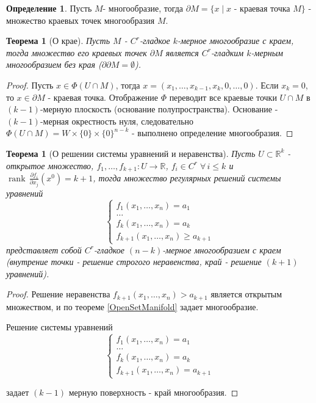 \documentclass[a5paper]{article}
\newcounter{through}
\theoremstyle{plain}
\newtheorem{theorem}[through]{Теорема}
\theoremstyle{definition}
\newtheorem{definition}[through]{Определение}
\numberwithin{through}{section}
\numberwithin{equation}{section}
\DeclareMathOperator{\rank}{rank}
\begin{document}
\begin{definition}
	Пусть $M$- многообразие, тогда $\partial M = \{x \mid x$ - краевая точка $M\}$ - множество краевых точек многообразия $M$.
\end{definition}

\begin{theorem}[О крае]
	Пусть $M$ - $C^r$-гладкое $k$-мерное многообразие с краем, тогда множество его краевых точек $\partial M$ является $C^r$-гладким $k$-мерным многообразием без края ($\partial \partial M = \emptyset$).
\end{theorem}

\begin{proof}
	Пусть $x \in \Phi(U \cap M)$, тогда $x=(x_1, \ldots, x_{k-1}, x_k, 0, \ldots, 0)$. %
	Если $x_k = 0$, то $x \in \partial M$ - краевая точка. Отображение $\Phi$ переводит все краевые точки $U \cap M$ в $(k-1)$-мерную плоскость (основание полупространства). Основание - $(k-1)$-мерная окрестность нуля, следовательно $\Phi(U \cap M) = W \times \{0\} \times \{0\}^{n-k}$ - выполнено определение многообразия.
\end{proof}

\begin{theorem}[О решении системы уравнений и неравенства]
	Пусть $U \subset \mathbb{R}^k$ - открытое множество, $f_1, \ldots, f_{k+1} : 
	U \to \mathbb{R}$, $f_i \in C^r \; \forall \, i \leq k$ и $\rank \, \frac{\partial f_i}{\partial x_j} (x^0) = k + 1$,  тогда множество регулярных решений системы уравнений
	\begin{equation*}
	\begin{cases}
	f_1(x_1, \ldots, x_n) = a_1
	\\
	\ldots
	\\
	f_k(x_1, \ldots, x_n) = a_k
	\\
	f_{k+1}(x_1, \ldots, x_n) \geq a_{k+1}
	\end{cases}
	\end{equation*}
	представляет собой $C^r$-гладкое $(n-k)$-мерное многообразием с краем (внутрение точки - решение строгого неравенства, край - решение $(k+1)$ уравнений).
\end{theorem}
\begin{proof}
	Решение неравенства $f_{k+1}(x_1, \ldots, x_n) > a_{k+1}$ является открытым множеством, и по теореме \ref{OpenSetManifold} задает многообразие.
	
	Решение системы уравнений 
	\begin{equation*}
	\begin{cases}
	f_1(x_1, \ldots, x_n) = a_1
	\\
	\ldots
	\\
	f_k(x_1, \ldots, x_n) = a_k
	\\
	f_{k+1}(x_1, \ldots, x_n) = a_{k+1}
	\end{cases}
	\end{equation*}
	
	задает $(k-1)$ мерную поверхность - край многообразия.
\end{proof}
\end{document}
